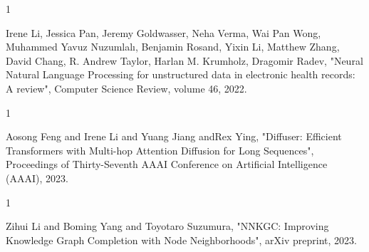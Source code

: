 \begin{雑誌論文}{1}

Irene Li, Jessica Pan, Jeremy Goldwasser, Neha Verma, Wai Pan Wong, Muhammed Yavuz Nuzumlalı, Benjamin Rosand, Yixin Li, Matthew Zhang, David Chang, R. Andrew Taylor, Harlan M. Krumholz, Dragomir Radev, "Neural Natural Language Processing for unstructured data in electronic health records: A review", Computer Science Review, volume 46, 2022.

\end{雑誌論文}

\begin{査読付}{1}

Aosong Feng and Irene Li and Yuang Jiang andRex  Ying, "Diffuser: Efficient Transformers with Multi-hop Attention Diffusion for Long Sequences", Proceedings of Thirty-Seventh AAAI Conference on Artificial Intelligence (AAAI), 2023.

\end{査読付}

\begin{発表}{1}

Zihui Li and Boming Yang and Toyotaro Suzumura, "NNKGC: Improving Knowledge Graph Completion with Node Neighborhoods", arXiv preprint, 2023.

\end{発表}